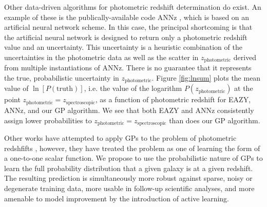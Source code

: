 \documentclass[prd,nofootbib,floatfix,11pt,tightenlines,nofootinbib]{revtex4}
\begin{document}
Other data-driven algorithms for photometric redshift determination do exist. 
An example of these is the publically-available code ANNz \cite{annz},
which is based on an artificial neural network scheme.
In this case, the principal
shortcoming  is that the artificial neural network
is designed to return only a
photometric redshift value and an uncertainty.
This uncertainty is a heuristic combination of the uncertainties in the
photometric data as well as the scatter in $z_\text{photometric}$ derived
from multiple instantiations of ANNz.  There is no guarantee that it represents
the true, probabilistic uncertainty in $z_\text{photometric}$.
Figure \ref{fig:lnsum} plots the mean value of $\ln[P(\text{truth})]$,
i.e. the value of the logarithm $P(z_\text{photometric})$ at the point
$z_\text{photometric}=z_\text{spectroscopic}$, 
as a function
of photometric redshift for EAZY, ANNz, and our GP algorithm.
We see that both EAZY and ANNz consistently assign lower probabilities to
$z_\text{photometric}=z_\text{spectroscopic}$ than does our GP algorithm.

Other works have attempted to apply GPs to the problem of
photometric redshfifts \cite{kaufman,bonfield}, however, they have treated
the problem as one of learning the form of a one-to-one scalar function.
We propose to use the probabilistic nature of GPs to learn the full
probability distribution that a given galaxy is at a given redshift.  The
resulting prediction is simultaneously more robust against sparse, noisy or
degenerate training data, more usable in follow-up scientific analyses, and
more amenable to model improvement by the introduction of active learning.
\end{document}
